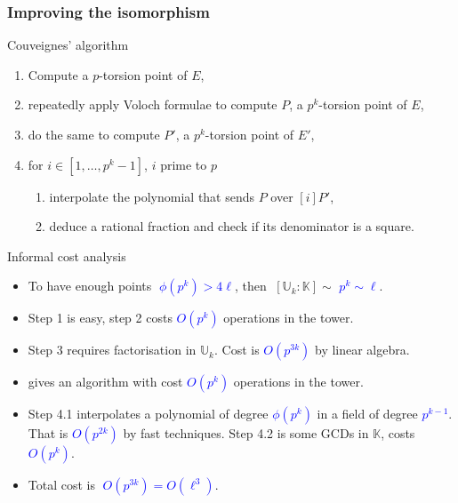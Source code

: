 \documentclass[10pt]{beamer}
\newcommand{\blue}[1]{\textcolor{blue}{#1}}  %
\newcommand{\K}{\mathbb{K}}  %
\newcommand{\U}{\mathbb{U}}  %
\newcommand{\euler}{\phi}  %
\newcommand{\0}{\mathcal{O}}  %
\begin{document}

\begin{frame}
  \frametitle{Improving the isomorphism}

  \vspace{-1mm}

  \begin{block}{Couveignes' algorithm}
    \begin{enumerate}
    \item Compute a $p$-torsion point of $E$,
    \item repeatedly apply Voloch formulae to compute $P$, a $p^k$-torsion
      point of $E$,
    \item \alert<1>{do the same to compute $P'$, a $p^k$-torsion point
      of $E'$,}
    \item for $i \in [1,\dots,p^k-1]$, $i$ prime to $p$
      \begin{enumerate}
      \item interpolate the polynomial that sends $P$ over $[i]P'$,
      \item deduce a rational fraction and check if its denominator is
        a square.
      \end{enumerate}
    \end{enumerate}
  \end{block}

  \vspace{-1mm}

  \begin{block}{Informal cost analysis}
    \begin{itemize}
    \item<0> To have enough points \blue{$\;\euler(p^k) > 4\ell$}, then
      $\;[\U_k:\K] \sim$ \blue{$p^k \sim \ell$}.
    \item<0> Step 1 is easy, step 2 costs \blue{$O(p^k)$}
      operations in the tower.
    \item<1> \alert{Step 3 requires factorisation in $\U_k$. Cost is
      \blue{$O(p^{3k})$} by linear algebra.}
    \item<1> \cite{Couveignes00} gives an algorithm with cost
      \blue{$O(p^k)$} operations in the tower.
    \item<0> Step 4.1 interpolates a polynomial of degree
      \blue{$\euler(p^k)$} in a field of degree \blue{$p^{k-1}$}. That
      is \blue{$O(p^{2k})$} by fast techniques.  Step 4.2 is some GCDs
      in $\K$, costs \blue{$O(p^k)$}.
    \item<0> Total cost is \blue{$\;O(p^{3k}) = O(\ell^3)$}.
    \end{itemize}
  \end{block}
\end{frame}
\end{document}
